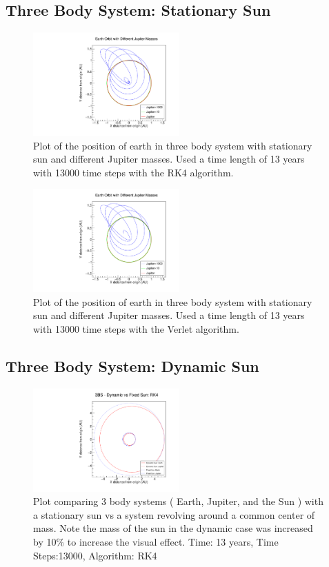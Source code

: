 \documentclass[a4paper,12pt]{report}
\begin{document}
\subsection{Three Body System: Stationary Sun}

\begin{figure}
 \centering
   \includegraphics[width=0.5\textwidth]{ESJFRK4_Earths.pdf}
  \caption{Plot of the position of earth in three body system with stationary sun and different Jupiter masses. Used a time length of 13 years with 13000 time steps with the RK4 algorithm.}
  \label{fig:ESJFRK4_Earths}
 \end{figure}

 \begin{figure}
 \centering
   \includegraphics[width=0.5\textwidth]{ESJFVerlet_Earths.pdf}
  \caption{Plot of the position of earth in three body system with stationary sun and different Jupiter masses. Used a time length of 13 years with 13000 time steps with the Verlet algorithm.}
  \label{fig:ESJFVerlet_Earths}
 \end{figure}


\subsection{Three Body System: Dynamic Sun}

 \begin{figure}
 \centering
   \includegraphics[width=0.5\textwidth]{ESJD_vs_ESJF_RK4.pdf}
  \caption{Plot comparing 3 body systems ( Earth, Jupiter, and the Sun ) with a stationary sun vs a system revolving around a common center of mass. Note the mass of the sun in the dynamic case was increased by 10\% to increase the visual effect. Time: 13 years, Time Steps:13000, Algorithm: RK4}
  \label{fig:ESJD_vs_ESJF_RK4}
 \end{figure}
\end{document}
